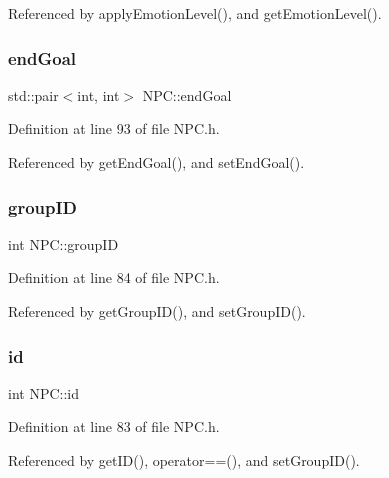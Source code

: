 Referenced by apply\+Emotion\+Level(), and get\+Emotion\+Level().

\mbox{\label{class_n_p_c_ab2349a8d6757b61a73f87de9cba387d1}} 
\subsubsection{\texorpdfstring{end\+Goal}{endGoal}}
{\footnotesize\ttfamily std\+::pair$<$int, int$>$ N\+P\+C\+::end\+Goal\hspace{0.3cm}{\ttfamily [private]}}



Definition at line 93 of file N\+P\+C.\+h.



Referenced by get\+End\+Goal(), and set\+End\+Goal().

\mbox{\label{class_n_p_c_ab370e8a4fbb5ccabdc06821f7dfda428}} 
\subsubsection{\texorpdfstring{group\+ID}{groupID}}
{\footnotesize\ttfamily int N\+P\+C\+::group\+ID\hspace{0.3cm}{\ttfamily [private]}}



Definition at line 84 of file N\+P\+C.\+h.



Referenced by get\+Group\+I\+D(), and set\+Group\+I\+D().

\mbox{\label{class_n_p_c_a1b705223f885df652f2faffc4735d03c}} 
\subsubsection{\texorpdfstring{id}{id}}
{\footnotesize\ttfamily int N\+P\+C\+::id\hspace{0.3cm}{\ttfamily [private]}}



Definition at line 83 of file N\+P\+C.\+h.



Referenced by get\+I\+D(), operator==(), and set\+Group\+I\+D().


